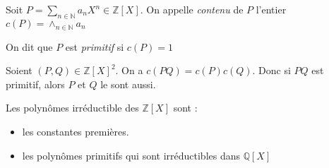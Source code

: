 \begin{defi} Soit $P=\sum_{n\in\mathbb{N}} a_n X^n \in\mathbb{Z}[X]$. On appelle \emph{contenu} de $P$ l'entier $c(P) = \wedge_{n\in\mathbb{N}} a_n$

    On dit que $P$ est \emph{primitif} si $c(P) = 1$
\end{defi}

\begin{prop} Soient $(P,Q)\in\mathbb{Z}[X]^2$. On a $c(PQ)=c(P)c(Q)$. Donc si $PQ$ est primitif, alors $P$ et $Q$ le sont aussi.
\end{prop}

\begin{prop} Les polynômes irréductible des $\mathbb{Z}[X]$ sont :\begin{itemize}
    \item les constantes premières.
    \item les polynômes primitifs qui sont irréductibles dans $\mathbb{Q}[X]$
\end{itemize}\end{prop}

